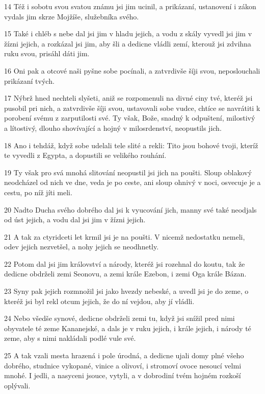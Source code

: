 \par 14 Též i sobotu svou svatou známu jsi jim ucinil, a prikázaní, ustanovení i zákon vydals jim skrze Mojžíše, služebníka svého.
\par 15 Také i chléb s nebe dal jsi jim v hladu jejich, a vodu z skály vyvedl jsi jim v žízni jejich, a rozkázal jsi jim, aby šli a dedicne vládli zemí, kterouž jsi zdvihna ruku svou, prisáhl dáti jim.
\par 16 Oni pak a otcové naši pyšne sobe pocínali, a zatvrdivše šíji svou, neposlouchali prikázaní tvých.
\par 17 Nýbrž hned nechteli slyšeti, aniž se rozpomenuli na divné ciny tvé, kteréž jsi pusobil pri nich, a zatvrdivše šíji svou, ustavovali sobe vudce, chtíce se navrátiti k porobení svému z zarputilosti své. Ty však, Bože, snadný k odpuštení, milostivý a lítostivý, dlouho shovívající a hojný v milosrdenství, neopustils jich.
\par 18 Ano i tehdáž, když sobe udelali tele slité a rekli: Tito jsou bohové tvoji, kteríž te vyvedli z Egypta, a dopustili se velikého rouhání.
\par 19 Ty však pro svá mnohá slitování neopustil jsi jich na poušti. Sloup oblakový neodcházel od nich ve dne, veda je po ceste, ani sloup ohnivý v noci, osvecuje je a cestu, po níž jíti meli.
\par 20 Nadto Ducha svého dobrého dal jsi k vyucování jich, manny své také neodjals od úst jejich, a vodu dal jsi jim v žízni jejich.
\par 21 A tak za ctyridceti let krmil jsi je na poušti. V nicemž nedostatku nemeli, odev jejich nezvetšel, a nohy jejich se neodhnetly.
\par 22 Potom dal jsi jim království a národy, kteréž jsi rozehnal do koutu, tak že dedicne obdrželi zemi Seonovu, a zemi krále Ezebon, i zemi Oga krále Bázan.
\par 23 Syny pak jejich rozmnožil jsi jako hvezdy nebeské, a uvedl jsi je do zeme, o kteréž jsi byl rekl otcum jejich, že do ní vejdou, aby jí vládli.
\par 24 Nebo všedše synové, dedicne obdrželi zemi tu, když jsi snížil pred nimi obyvatele té zeme Kananejské, a dals je v ruku jejich, i krále jejich, i národy té zeme, aby s nimi nakládali podlé vule své.
\par 25 A tak vzali mesta hrazená i pole úrodná, a dedicne ujali domy plné všeho dobrého, studnice vykopané, vinice a olivoví, i stromoví ovoce nesoucí velmi mnohé. I jedli, a nasyceni jsouce, vytyli, a v dobrodiní tvém hojném rozkoší oplývali.
